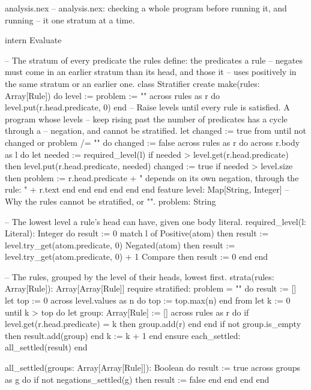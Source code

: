 \begin{newfile}{analysis.nex}
-- analysis.nex: checking a whole program before running it, and running
-- it one stratum at a time.

intern Evaluate

-- The stratum of every predicate the rules define: the predicates a rule
-- negates must come in an earlier stratum than its head, and those it
-- uses positively in the same stratum or an earlier one.
class Stratifier
create
  make(rules: Array[Rule])
  do
    level := {}
    problem := ""
    across rules as r do
      level.put(r.head.predicate, 0)
    end
    -- Raise levels until every rule is satisfied. A program whose levels
    -- keep rising past the number of predicates has a cycle through a
    -- negation, and cannot be stratified.
    let changed := true
    from until not changed or problem /= "" do
      changed := false
      across rules as r do
        across r.body as l do
          let needed := required_level(l)
          if needed > level.get(r.head.predicate) then
            level.put(r.head.predicate, needed)
            changed := true
            if needed > level.size then
              problem := r.head.predicate + " depends on its own negation, through the rule: " + r.text
            end
          end
        end
      end
    end
  end
feature
  level: Map[String, Integer]
  -- Why the rules cannot be stratified, or "".
  problem: String

  -- The lowest level a rule's head can have, given one body literal.
  required_level(l: Literal): Integer
  do
    result := 0
    match l of
      Positive(atom) then result := level.try_get(atom.predicate, 0)
      Negated(atom)  then result := level.try_get(atom.predicate, 0) + 1
      Compare        then result := 0
    end
  end

  -- The rules, grouped by the level of their heads, lowest first.
  strata(rules: Array[Rule]): Array[Array[Rule]]
  require
    stratified: problem = ""
  do
    result := []
    let top := 0
    across level.values as n do
      top := top.max(n)
    end
    from let k := 0 until k > top do
      let group: Array[Rule] := []
      across rules as r do
        if level.get(r.head.predicate) = k then
          group.add(r)
        end
      end
      if not group.is_empty then
        result.add(group)
      end
      k := k + 1
    end
  ensure
    each_settled: all_settled(result)
  end

  all_settled(groups: Array[Array[Rule]]): Boolean
  do
    result := true
    across groups as g do
      if not negations_settled(g) then
        result := false
      end
    end
  end
end
\end{newfile}

